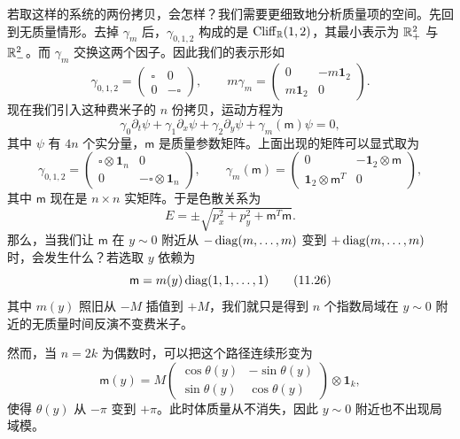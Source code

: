 若取这样的系统的两份拷贝，会怎样？我们需要更细致地分析质量项的空间。先回到无质量情形。去掉 $\gamma_m$ 后，$\gamma_{0,1,2}$ 构成的是 $\mathrm{Cliff}_{\mathbb{R}}(1,2)$，其最小表示为 $\mathbb{R}^2_+$ 与 $\mathbb{R}^2_-$。而 $\gamma_m$ 交换这两个因子。因此我们的表示形如
\begin{equation}
\gamma_{0,1,2}=\begin{pmatrix}\square&0\\0&-\square\end{pmatrix},\qquad
m\gamma_m=\begin{pmatrix}0&-m\mathbf{1}_2\\ m\mathbf{1}_2&0\end{pmatrix}. \tag{11.22}
\end{equation}
现在我们引入这种费米子的 $n$ 份拷贝，运动方程为
\begin{equation}
\gamma_0\partial_t\psi+\gamma_1\partial_x\psi+\gamma_2\partial_y\psi+\gamma_m(\mathsf{m})\psi=0, \tag{11.23}
\end{equation}
其中 $\psi$ 有 $4n$ 个实分量，$\mathsf{m}$ 是质量参数矩阵。上面出现的矩阵可以显式取为
\begin{equation}
\gamma_{0,1,2}=\begin{pmatrix}\square\otimes\mathbf{1}_n&0\\0&-\square\otimes\mathbf{1}_n\end{pmatrix},\qquad
\gamma_m(\mathsf{m})=\begin{pmatrix}0&-\mathbf{1}_2\otimes\mathsf{m}\\ \mathbf{1}_2\otimes\mathsf{m}^T&0\end{pmatrix}, \tag{11.24}
\end{equation}
其中 $\mathsf{m}$ 现在是 $n\times n$ 实矩阵。于是色散关系为
\begin{equation}
E=\pm\sqrt{p_x^2+p_y^2+\mathsf{m}^T\mathsf{m}}. \tag{11.25}
\end{equation}
那么，当我们让 $\mathsf{m}$ 在 $y\sim0$ 附近从 $-\operatorname{diag}(m,\ldots,m)$ 变到 $+\operatorname{diag}(m,\ldots,m)$ 时，会发生什么？若选取 $y$ 依赖为
\begin{equation}
\mathsf{m}=m(y)\operatorname{diag}(1,1,\ldots,1) \tag{11.26}
\end{equation}
其中 $m(y)$ 照旧从 $-M$ 插值到 $+M$，我们就只是得到 $n$ 个指数局域在 $y\sim0$ 附近的无质量时间反演不变费米子。

然而，当 $n=2k$ 为偶数时，可以把这个路径连续形变为
\begin{equation}
\mathsf{m}(y)=M\begin{pmatrix}\cos\theta(y)&-\sin\theta(y)\\[2pt] \sin\theta(y)&\cos\theta(y)\end{pmatrix}\otimes\mathbf{1}_k, \tag{11.27}
\end{equation}
使得 $\theta(y)$ 从 $-\pi$ 变到 $+\pi$。此时体质量从不消失，因此 $y\sim0$ 附近也不出现局域模。

